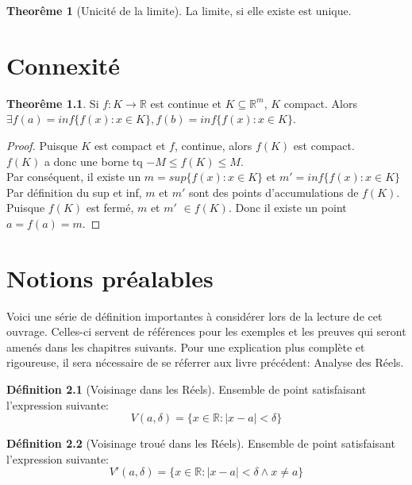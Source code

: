 \documentclass[12pt]{book}
\let\Bbb\mathbb
\theoremstyle{definition}
\newtheorem{definition}{Définition}[section]
\newtheorem{theorem}{Theorême}[section]
\begin{document}
\begin{theorem}[Unicité de la limite]
    \label{thm:limite_unique}
    La limite, si elle existe est unique.
\end{theorem}

\chapter{Connexité}

\begin{theorem}
    Si $f: K \to \Bbb R$ est continue et $K \subseteq \Bbb R^m$, $K$ compact. Alors $\exists f(a) = inf\{f(x) : x \in K\}, f(b) = inf\{f(x) : x \in K\}$.
\end{theorem}

\begin{proof}
    Puisque $K$ est compact et $f$, continue, alors $f(K)$ est compact.\\
    $f(K)$ a donc une borne tq $-M \leq f(K) \leq M$.\\
    Par conséquent, il existe un $m = sup\{f(x): x \in K\}$ et $m' = inf\{f(x): x \in K\}$\\
    Par définition du sup et inf, $m$ et  $m'$ sont des points d'accumulations de $f(K)$.\\
    Puisque $f(K)$ est fermé, $m$ et $m'$ $\in f(K)$. Donc il existe un point $a = f(a) = m$.
\end{proof}
\appendix
\chapter{Notions préalables}
Voici une série de définition importantes à considérer lors de la lecture de cet ouvrage. Celles-ci servent
de références pour les exemples et les preuves qui seront amenés dans les chapitres suivants. Pour une explication
plus complète et rigoureuse, il sera nécessaire de se réferrer aux livre précédent: Analyse des Réels.

\begin{definition}[Voisinage dans les Réels]
    \label{def:voisinage_reels}
    Ensemble de point satisfaisant l'expression
    suivante: $$V(a, \delta) = \{ x \in \Bbb R : |x - a| < \delta \}$$
\end{definition}

\begin{definition}[Voisinage troué dans les Réels]
    \label{def:voisinage_troue_reels}
    Ensemble de point satisfaisant l'expression
    suivante: $$V'(a, \delta) = \{ x \in \Bbb R : |x - a| < \delta \land x \neq a \}$$
\end{definition}
\end{document}
